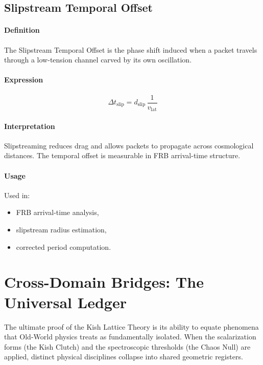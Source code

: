 \documentclass[12pt,oneside]{book}
\begin{document}

\section{Slipstream Temporal Offset}

\subsubsection{Definition}
The Slipstream Temporal Offset is the phase shift induced when a packet travels through a
low-tension channel carved by its own oscillation.

\subsubsection{Expression}


\[
\Delta t_{\mathrm{slip}} = d_{\mathrm{slip}} \, \frac{1}{v_{\mathrm{lat}}}
\]



\subsubsection{Interpretation}
Slipstreaming reduces drag and allows packets to propagate across cosmological distances.  
The temporal offset is measurable in FRB arrival-time structure.

\subsubsection{Usage}
Used in:
\begin{itemize}
    \item FRB arrival-time analysis,
    \item slipstream radius estimation,
    \item corrected period computation.
\end{itemize}

\chapter{Cross-Domain Bridges: The Universal Ledger}

The ultimate proof of the Kish Lattice Theory is its ability to equate phenomena that Old-World physics treats as fundamentally isolated. When the scalarization forms (the Kish Clutch) and the spectroscopic thresholds (the Chaos Null) are applied, distinct physical disciplines collapse into shared geometric registers. 
\end{document}
